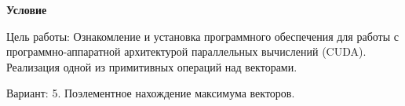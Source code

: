 \textbf{\large Условие}

Цель работы: Ознакомление и установка программного обеспечения для работы с программно-аппаратной архитектурой параллельных вычислений (CUDA). Реализация одной из примитивных операций над векторами.

Вариант: 5. Поэлементное нахождение максимума векторов.

